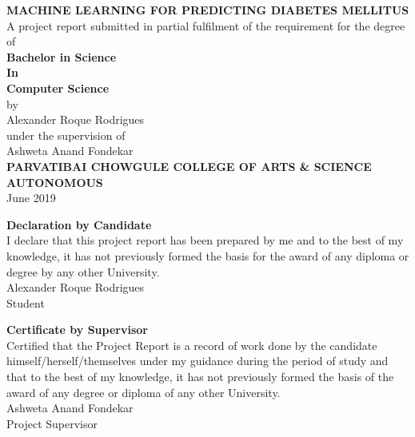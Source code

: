 \documentclass[12pt]{article}
\begin{document}
\begin{titlepage}
\newcommand{\HRule}{\rule{\linewidth}{0.5mm}} 
\center
\doublespacing
\textbf{\Huge MACHINE LEARNING FOR PREDICTING DIABETES MELLITUS}
\\
\singlespacing
\Large
\vspace{3cm}
A project report submitted in partial fulfilment of the requirement for the degree of\\
\vspace{1cm}
\textbf{Bachelor in Science\\In\\Computer Science}
\\by\\
\vspace{1cm}
\Large
Alexander Roque Rodrigues
\\
\normalsize
\vspace{0.5cm}
under the supervision of
\\
\Large
Ashweta Anand Fondekar
\\
\vspace{3cm}
\Large
\textbf{PARVATIBAI CHOWGULE COLLEGE OF ARTS \& SCIENCE AUTONOMOUS}
\\June 2019
\end{titlepage}

\onehalfspacing
\newpage
\vspace{15cm}
\begin{center}
\Huge{\textbf{Declaration by Candidate}}\\
\normalsize
\vspace{5cm}
I declare that this project report has been prepared by me and to the best of my
knowledge, it has not previously formed the basis for the award of any diploma or degree by
any other University.\\
\vspace{5cm}
Alexander Roque Rodrigues\\

Student
\end{center}
\newpage
\vspace{15cm}

\begin{center}
\Huge{\textbf{Certificate by Supervisor}}\\
\normalsize
\vspace{5cm}
Certified that the Project Report is a record of work done by the candidate himself/herself/themselves under my guidance during the period of study and that to the best of my knowledge, it has not previously formed the basis of the award of any degree or diploma of any other University.\\
\vspace{5cm}
Ashweta Anand Fondekar\\

Project Supervisor
\end{center}
\end{document}
